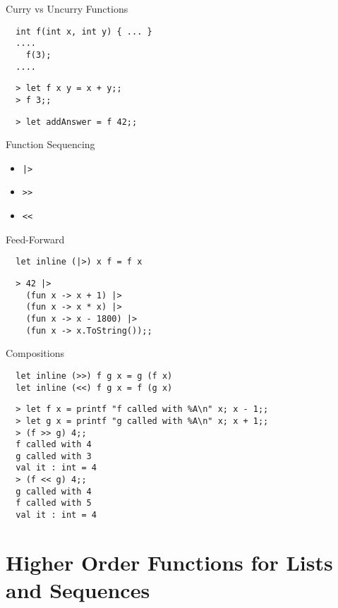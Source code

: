 \documentclass{beamer}
\begin{document}
\begin{frame}[fragile]{Curry vs Uncurry Functions}
  \begin{verbatim}
  int f(int x, int y) { ... }
  ....
    f(3);
  ....
  \end{verbatim}
  \pause
  \begin{verbatim}
  > let f x y = x + y;;
  > f 3;;
  \end{verbatim}
  \pause
  \begin{verbatim}
  > let addAnswer = f 42;;
  \end{verbatim}
\end{frame}

\begin{frame}{Function Sequencing}
  \begin{itemize}
    \item \texttt{|>}
    \item \texttt{>>}
    \item \texttt{<<}
  \end{itemize}
\end{frame}

\begin{frame}[fragile]{Feed-Forward}
  \begin{verbatim}
  let inline (|>) x f = f x
  \end{verbatim}
  \begin{verbatim}
  > 42 |>
    (fun x -> x + 1) |>
    (fun x -> x * x) |>
    (fun x -> x - 1800) |>
    (fun x -> x.ToString());;
  \end{verbatim}
\end{frame}

\begin{frame}[fragile]{Compositions}
  \begin{verbatim}
  let inline (>>) f g x = g (f x)
  let inline (<<) f g x = f (g x)
  \end{verbatim}
  \begin{verbatim}
  > let f x = printf "f called with %A\n" x; x - 1;;
  > let g x = printf "g called with %A\n" x; x + 1;;
  > (f >> g) 4;;
  f called with 4
  g called with 3
  val it : int = 4
  > (f << g) 4;;
  g called with 4
  f called with 5
  val it : int = 4
  \end{verbatim}
\end{frame}

\section{Higher Order Functions for Lists and Sequences}
\frame{\tableofcontents[currentsection]}
\end{document}
